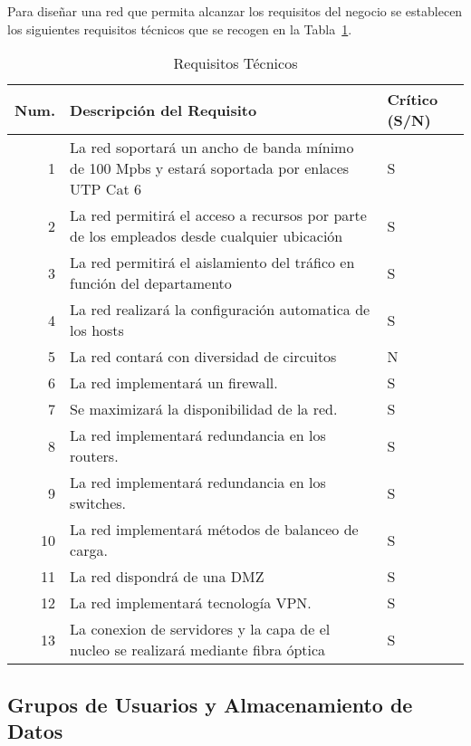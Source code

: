 \documentclass[a4paper,onecolumn,11pt]{article}
\begin{document}
Para diseñar una red que permita alcanzar los requisitos del negocio se
establecen los siguientes requisitos técnicos que se recogen en la Tabla~\ref{tab:requisitosTecnicos}.



\begin{table}[htbp]
\small \sffamily
\caption{Requisitos Técnicos}
\begin{center}
\begin{tabular}{rp{}p{}}
\toprule
\textbf{Num.} &  \textbf{Descripción del Requisito} & \textbf{Crítico (S/N)}\\
\toprule

1 & La red soportará un ancho de banda mínimo de 100 Mpbs y
estará soportada por enlaces UTP Cat 6  & S \\ \midrule
2 & La red permitirá el acceso a recursos por parte de los empleados desde cualquier ubicación & S \\ \midrule
3 & La red permitirá el aislamiento del tráfico en función del departamento & S \\ \midrule
4 & La red realizará la configuración automatica de los hosts & S \\ \midrule
5 & La red contará con diversidad de circuitos & N \\ \midrule
6 & La red implementará un firewall. & S \\ \midrule
7 & Se maximizará la disponibilidad de la red. & S \\ \midrule
8 & La red implementará redundancia en los routers. & S \\ \midrule
9 & La red implementará redundancia en los switches. & S \\ \midrule
10 & La red implementará métodos de balanceo de carga. & S \\ \midrule
11 & La red dispondrá de una DMZ & S \\ \midrule
12 & La red implementará tecnología VPN. & S \\ \midrule
13 & La conexion de servidores y la capa de el nucleo se realizará mediante fibra óptica & S \\ %

\bottomrule
\end{tabular}
\end{center}
\label{tab:requisitosTecnicos}
\end{table}


\subsection{Grupos de Usuarios y Almacenamiento de Datos}
\end{document}
